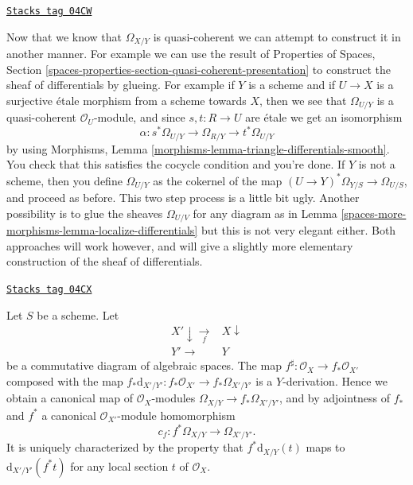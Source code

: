 \begin{remark}[Alternative]
\label{spaces-more-morphisms-remark-alternative}
\href{https://stacks.math.columbia.edu/tag/04CW}{\texttt{Stacks tag 04CW}}

Now that we know that $\Omega_{X/Y}$ is quasi-coherent we can attempt
to construct it in another manner. For example we can use the result of
Properties of Spaces,
Section \ref{spaces-properties-section-quasi-coherent-presentation}
to construct the sheaf of differentials by glueing.
For example if $Y$ is a scheme and if $U \to X$ is a surjective \'etale morphism
from a scheme towards $X$, then we see that $\Omega_{U/Y}$ is
a quasi-coherent $\mathcal{O}_U$-module, and since $s, t : R \to U$
are \'etale we get an isomorphism
$$
\alpha : s^*\Omega_{U/Y} \to \Omega_{R/Y} \to t^*\Omega_{U/Y}
$$
by using
Morphisms, Lemma \ref{morphisms-lemma-triangle-differentials-smooth}.
You check that this satisfies the cocycle condition and you're done.
If $Y$ is not a scheme, then you define $\Omega_{U/Y}$ as the cokernel
of the map $(U \to Y)^*\Omega_{Y/S} \to \Omega_{U/S}$, and proceed as
before. This two step process is a little bit ugly. Another possibility
is to glue the sheaves $\Omega_{U/V}$ for any diagram as in
Lemma \ref{spaces-more-morphisms-lemma-localize-differentials}
but this is not very elegant either. Both approaches will work however, and
will give a slightly more elementary construction of the sheaf of
differentials.
\end{remark}

\begin{lemma}
\label{spaces-more-morphisms-lemma-functoriality-differentials}
\href{https://stacks.math.columbia.edu/tag/04CX}{\texttt{Stacks tag 04CX}}

Let $S$ be a scheme. Let
$$
\begin{array}{cc}X' \downarrow\underset{f}{\longrightarrow} & X \downarrow \\ Y' \longrightarrow & Y\end{array}
$$
be a commutative diagram of algebraic spaces. The map
$f^\sharp : \mathcal{O}_X \to f_*\mathcal{O}_{X'}$ composed with the map
$f_*\text{d}_{X'/Y'} : f_*\mathcal{O}_{X'} \to f_*\Omega_{X'/Y'}$ is a
$Y$-derivation. Hence we obtain a canonical map of $\mathcal{O}_X$-modules
$\Omega_{X/Y} \to f_*\Omega_{X'/Y'}$, and by
adjointness of $f_*$ and $f^*$ a
canonical $\mathcal{O}_{X'}$-module homomorphism
$$
c_f : f^*\Omega_{X/Y} \longrightarrow \Omega_{X'/Y'}.
$$
It is uniquely characterized by the property that
$f^*\text{d}_{X/Y}(t)$ maps to $\text{d}_{X'/Y'}(f^* t)$
for any local section $t$ of $\mathcal{O}_X$.
\end{lemma}

